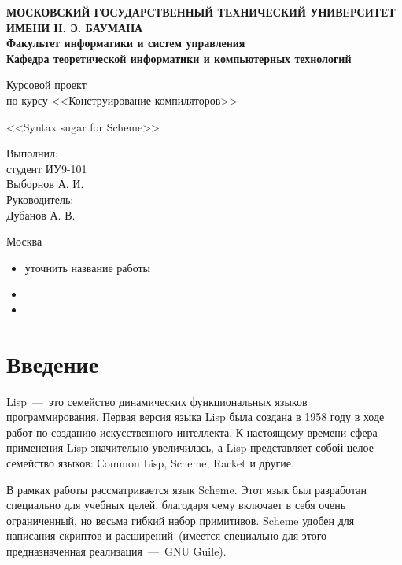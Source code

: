 \documentclass[12pt,a4paper,oneside]{extarticle}
\begin{document}
\pgfplotsset{compat=1.8}

\thispagestyle{empty}
\newpage
{
\centering


\textbf{
МОСКОВСКИЙ ГОСУДАРСТВЕННЫЙ ТЕХНИЧЕСКИЙ УНИВЕРСИТЕТ ИМЕНИ Н. Э. БАУМАНА \\
Факультет информатики и систем управления \\
Кафедра теоретической информатики и компьютерных технологий}
\bigskip
\bigskip
\bigskip
\bigskip
\bigskip
\bigskip
\bigskip

\vfill


Курсовой проект \\
по курсу <<Конструирование компиляторов>>

\bigskip

{\large <<Syntax sugar for Scheme>>}
\bigskip

\vfill



\hfill\parbox{4cm} {
Выполнил:\\
студент ИУ9-101 \hfill \\
Выборнов А. И.\hfill \medskip\\
Руководитель:\\
Дубанов А. В.\hfill
}


\vspace{\fill}

Москва \number\year
\clearpage
}


\tableofcontents

\clearpage

\begin{itemize}
    \item уточнить название работы
    \item
    \item
\end{itemize}

\clearpage

\section*{Введение}
    Lisp~---~это семейство динамических функциональных языков программирования.
    Первая версия языка Lisp была создана в 1958 году в ходе работ по созданию искусственного интеллекта.
    К настоящему времени сфера применения Lisp значительно увеличилась, а Lisp представляет собой целое семейство языков: Сommon Lisp, Scheme, Racket и другие. 

    В рамках работы рассматривается язык Scheme.
    Этот язык был разработан специально для учебных целей, благодаря чему включает в себя очень ограниченный, но весьма гибкий набор примитивов.
    Scheme удобен для написания скриптов и расширений~(имеется специально для этого предназначенная реализация~---~GNU Guile).
\end{document}
